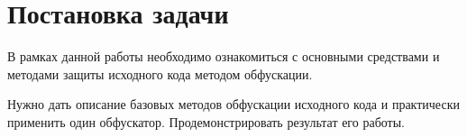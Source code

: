 \newpage
\section*{Постановка задачи}

\vspace{2em}

В рамках данной работы необходимо ознакомиться с основными средствами и методами защиты исходного кода методом обфускации.

Нужно дать описание базовых методов обфускации исходного кода и практически применить один обфускатор. Продемонстрировать результат его работы.